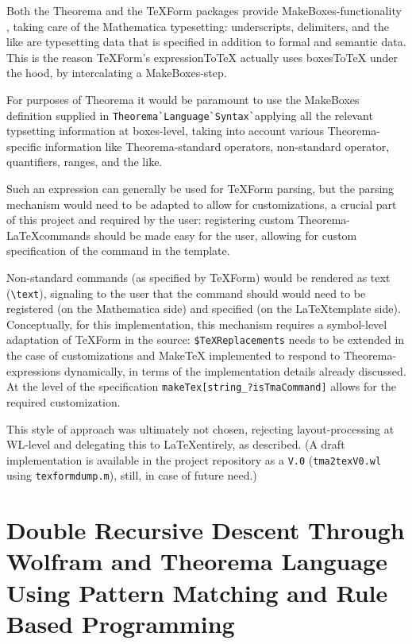 Both the Theorema and the TeXForm packages provide MakeBoxes-functionality \cite{noauthor_makeboxeswolfram_nodate}, taking care of the Mathematica typesetting: underscripts, delimiters, and the like are typesetting data that is specified in addition to formal and semantic data. This is the reason TeXForm's expressionToTeX actually uses boxesToTeX under the hood, by intercalating a MakeBoxes-step.

For purposes of Theorema it would be paramount to use the MakeBoxes definition supplied in \verb|Theorema`Language`Syntax`|applying all the relevant typsetting information at boxes-level, taking into account various Theorema-specific information like Theorema-standard operators, non-standard operator, quantifiers, ranges, and the like.

Such an expression can generally be used for TeXForm parsing, but the parsing mechanism would need to be adapted to allow for customizations, a crucial part of this project and required by the user: registering custom Theorema-\LaTeX commands should be made easy for the user, allowing for custom specification of the command in the template. 

Non-standard commands (as specified by TeXForm) would be rendered as text (\verb|\text|), signaling to the user that the command should would need to be registered (on the Mathematica side) and specified (on the \LaTeX template side). Conceptually, for this implementation, this mechanism requires a symbol-level adaptation of TeXForm in the source: \verb|$TeXReplacements| needs to be extended in the case of customizations and MakeTeX implemented to respond to Theorema-expressions dynamically, in terms of the implementation details already discussed. At the level of the specification \verb|makeTex[string_?isTmaCommand]| allows for the required customization.

This style of approach was ultimately not chosen, rejecting layout-processing at WL-level and delegating this to \LaTeX entirely, as described. (A draft implementation is available in the project repository as a \verb|V.0| (\verb|tma2texV0.wl| using \verb|texformdump.m|), still, in case of future need.)

\section{Double Recursive Descent Through Wolfram and Theorema Language Using Pattern Matching and Rule Based Programming} \label{pattern-matching-concept}

